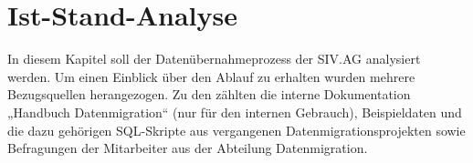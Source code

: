 
\chapter{Ist-Stand-Analyse}
In diesem Kapitel soll der Datenübernahmeprozess der SIV.AG analysiert werden. Um einen Einblick über den Ablauf zu erhalten wurden mehrere Bezugsquellen herangezogen. Zu den zählten die interne Dokumentation „Handbuch Datenmigration“ (nur für den internen Gebrauch), Beispieldaten und die dazu gehörigen SQL-Skripte aus vergangenen Datenmigrationsprojekten sowie Befragungen der Mitarbeiter aus der Abteilung  Datenmigration.

